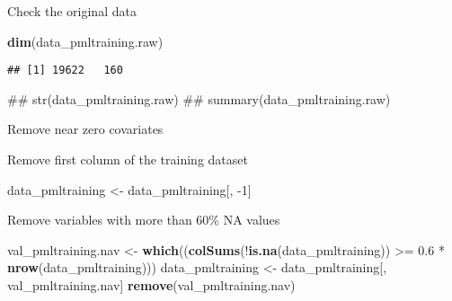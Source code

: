 \documentclass[]{article}
\newenvironment{Shaded}{\begin{snugshade}}{\end{snugshade}}
\newcommand{\KeywordTok}[1]{\textcolor[rgb]{0.13,0.29,0.53}{\textbf{{#1}}}}
\newcommand{\DataTypeTok}[1]{\textcolor[rgb]{0.13,0.29,0.53}{{#1}}}
\newcommand{\DecValTok}[1]{\textcolor[rgb]{0.00,0.00,0.81}{{#1}}}
\newcommand{\FloatTok}[1]{\textcolor[rgb]{0.00,0.00,0.81}{{#1}}}
\newcommand{\StringTok}[1]{\textcolor[rgb]{0.31,0.60,0.02}{{#1}}}
\newcommand{\OtherTok}[1]{\textcolor[rgb]{0.56,0.35,0.01}{{#1}}}
\newcommand{\NormalTok}[1]{{#1}}
\begin{document}
Check the original data

\begin{Shaded}
\begin{Highlighting}[]
\KeywordTok{dim}\NormalTok{(data_pmltraining.raw)}
\end{Highlighting}
\end{Shaded}

\begin{verbatim}
## [1] 19622   160
\end{verbatim}

\begin{Shaded}
\begin{Highlighting}[]
\NormalTok{## str(data_pmltraining.raw)}
\NormalTok{## summary(data_pmltraining.raw)}
\end{Highlighting}
\end{Shaded}

Remove near zero covariates

\begin{Shaded}
\end{Shaded}

Remove first column of the training dataset

\begin{Shaded}
\begin{Highlighting}[]
\NormalTok{data_pmltraining <-}\StringTok{ }\NormalTok{data_pmltraining[, -}\DecValTok{1}\NormalTok{]}
\end{Highlighting}
\end{Shaded}

Remove variables with more than 60\% NA values

\begin{Shaded}
\begin{Highlighting}[]
\NormalTok{val_pmltraining.nav <-}\StringTok{ }\KeywordTok{which}\NormalTok{((}\KeywordTok{colSums}\NormalTok{(!}\KeywordTok{is.na}\NormalTok{(data_pmltraining)) >=}\StringTok{ }\FloatTok{0.6} \NormalTok{*}\StringTok{ }\KeywordTok{nrow}\NormalTok{(data_pmltraining)))}
\NormalTok{data_pmltraining <-}\StringTok{ }\NormalTok{data_pmltraining[, val_pmltraining.nav]}
\KeywordTok{remove}\NormalTok{(val_pmltraining.nav)}
\end{Highlighting}
\end{Shaded}
\end{document}
